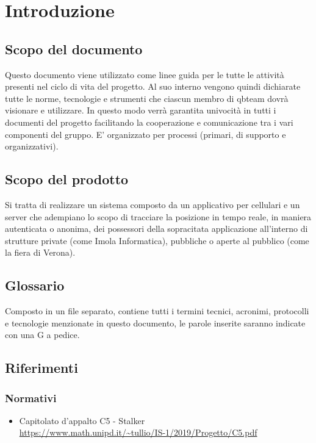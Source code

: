 \section{Introduzione}
\subsection{Scopo del documento}
	Questo documento viene utilizzato come linee guida per le tutte le attività presenti nel ciclo di vita del progetto.
	Al suo interno vengono quindi dichiarate tutte le norme, tecnologie e strumenti che ciascun membro di qbteam dovrà visionare e utilizzare.
	In questo modo verrà garantita univocità in tutti i documenti del progetto facilitando la cooperazione e comunicazione tra i vari componenti del gruppo.
	E' organizzato per processi (primari, di supporto e organizzativi).
	
\subsection{Scopo del prodotto}
	Si tratta di realizzare un sistema composto da un applicativo per cellulari e un server che adempiano lo scopo di tracciare la posizione in tempo reale, in maniera autenticata o anonima, dei possessori della sopracitata applicazione all’interno di strutture private (come Imola Informatica),  pubbliche o aperte al pubblico (come la fiera di Verona).
	 
\subsection{Glossario}
	Composto in un file separato, contiene tutti i termini tecnici, acronimi, protocolli e tecnologie menzionate in questo documento, le parole inserite saranno indicate con una G a pedice.
	
\subsection{Riferimenti} 
\subsubsection{Normativi}
\begin{itemize}
	\item Capitolato d'appalto C5 - Stalker 
	\\ \url{https://www.math.unipd.it/~tullio/IS-1/2019/Progetto/C5.pdf}
\end{itemize}

